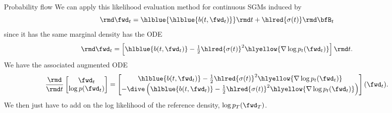 \begin{frame}{Probability flow \cite{song2021Scorebased}}
%
We can apply this likelihood evaluation method for continuous SGMs induced by%
\begin{equation}
  \rmd \fwd_t = \hlblue{\hlblue{b(t, \fwd_t)}} \rmd t + \hlred{\sigma(t)} \rmd \bfB_t
\end{equation}
since it has the same marginal density has the ODE
\begin{equation*}
    \rmd \fwd_t = \left[ \hlblue{b(t, \fwd_t)} - \tfrac{1}{2} \hlred{\sigma(t)}^2 \hlyellow{\nabla \log p_t(\fwd_t)} \right] \rmd t.
\end{equation*}
\pause
We have the associated augmented ODE
\begin{equation}
    \frac{\rmd}{\rmd t} 
    \begin{bmatrix} \fwd_t \\ \log p(\fwd_t) \end{bmatrix}
    = {\begin{bmatrix} \hlblue{b(t, \fwd_t)} - \tfrac{1}{2} \hlred{\sigma(t)}^2 \hlyellow{\nabla \log p_t(\fwd_t)} \\ 
    -\dive\left(\hlblue{b(t, \fwd_t)} - \tfrac{1}{2} \hlred{\sigma(t)}^2 \hlyellow{\nabla \log p_t(\fwd_t)}\right) \end{bmatrix}(\fwd_t)}.
\end{equation}
We then just have to add on the log likelihood of the reference density, $\log p_T(\fwd_T)$.

\end{frame}
